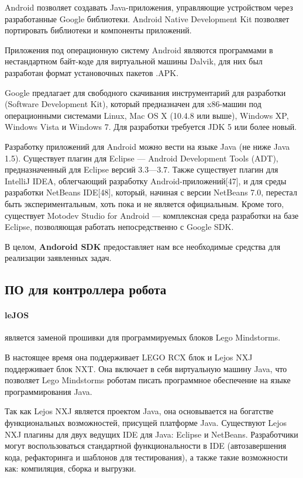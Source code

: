 Android позволяет создавать Java-приложения, управляющие устройством через разработанные Google библиотеки. Android Native Development Kit позволяет портировать библиотеки и компоненты приложений.

Приложения под операционную систему Android являются программами в нестандартном байт-коде для виртуальной машины Dalvik, для них был разработан формат установочных пакетов .APK.

Google предлагает для свободного скачивания инструментарий для разработки (Software Development Kit), который предназначен для x86-машин под операционными системами Linux, Mac OS X (10.4.8 или выше), Windows XP, Windows Vista и Windows 7. Для разработки требуется JDK 5 или более новый.

Разработку приложений для Android можно вести на языке Java (не ниже Java 1.5). Существует плагин для Eclipse — Android Development Tools (ADT), предназначенный для Eclipse версий 3.3—3.7. Также существует плагин для IntelliJ IDEA, облегчающий разработку Android-приложений[47], и для среды разработки NetBeans IDE[48], который, начиная с версии NetBeans 7.0, перестал быть экспериментальным, хоть пока и не является официальным. Кроме того, существует Motodev Studio for Android — комплексная среда разработки на базе Eclipse, позволяющая работать непосредственно с Google SDK.

В целом, \textbf{Andoroid SDK} предоставляет нам все необходимые средства для реализации заявленных задач.

\subsection{ПО для контроллера робота}

\paragraph{leJOS} является заменой прошивки для программируемых блоков Lego Mindstorms.

В настоящее время она поддерживает LEGO RCX блок и Lejos NXJ поддерживает блок NXT. Она включает в себя виртуальную машину Java, что позволяет Lego Mindstorms роботам писать программное обеспечение на языке программирования Java. 

Так как Lejos NXJ является проектом Java, она основывается на богатстве функциональных возможностей, присущей платформе Java. Существуют Lejos NXJ плагины для двух ведущих IDE для Java: Eclipse и NetBeans. Разработчики могут воспользоваться стандартной функциональности в IDE (автозавершения кода, рефакторинга и шаблонов для тестирования), а также такие возможности как: компиляция, сборка и выгрузки. 

